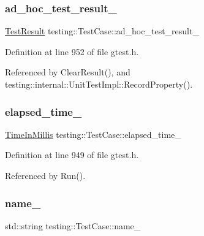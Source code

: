 \subsubsection{\texorpdfstring{ad\+\_\+hoc\+\_\+test\+\_\+result\+\_\+}{ad\_hoc\_test\_result\_}}
{\footnotesize\ttfamily \hyperlink{classtesting_1_1TestResult}{Test\+Result} testing\+::\+Test\+Case\+::ad\+\_\+hoc\+\_\+test\+\_\+result\+\_\+\hspace{0.3cm}{\ttfamily [private]}}



Definition at line 952 of file gtest.\+h.



Referenced by Clear\+Result(), and testing\+::internal\+::\+Unit\+Test\+Impl\+::\+Record\+Property().

\mbox{\label{classtesting_1_1TestCase_a0379c376d8832e6fd1d5d9c7c3c32759}} 
\subsubsection{\texorpdfstring{elapsed\+\_\+time\+\_\+}{elapsed\_time\_}}
{\footnotesize\ttfamily \hyperlink{namespacetesting_a992de1d091ce660f451d1e8b3ce30fd6}{Time\+In\+Millis} testing\+::\+Test\+Case\+::elapsed\+\_\+time\+\_\+\hspace{0.3cm}{\ttfamily [private]}}



Definition at line 949 of file gtest.\+h.



Referenced by Run().

\mbox{\label{classtesting_1_1TestCase_a6c16e28e7555dc6a158415b3bfc4f833}} 
\subsubsection{\texorpdfstring{name\+\_\+}{name\_}}
{\footnotesize\ttfamily std\+::string testing\+::\+Test\+Case\+::name\+\_\+\hspace{0.3cm}{\ttfamily [private]}}



